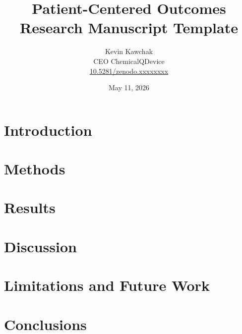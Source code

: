 \documentclass[11pt]{article}
\title{Patient-Centered Outcomes Research Manuscript Template}
\author{
  Kevin Kawchak\hspace{2pt}\orcidicon{0009-0007-5457-8667} \\
  CEO ChemicalQDevice\\
  \href{https://doi.org/10.5281/zenodo.xxxxxxxx}{10.5281/zenodo.xxxxxxxx} \\
}
\date{May 11, 2026}
\begin{document}
\maketitle

\begin{abstract}

\end{abstract}

\keywords{ }

\vspace{-0.2cm}

\section{Introduction}
\label{sec:introduction}


\tableofcontents
\vspace{0.4cm}

\newpage
\section{Methods}
\label{sec:methods}

\newpage

\section{Results}
\label{sec:results}

\newpage

\section{Discussion}
\label{sec:discussion}


\section{Limitations and Future Work}
\label{sec:limitations}

\newpage

\section{Conclusions}
\label{sec:conclusions}

\newpage

{}
\begingroup
\raggedright


\endgroup
\newpage


\end{document}
